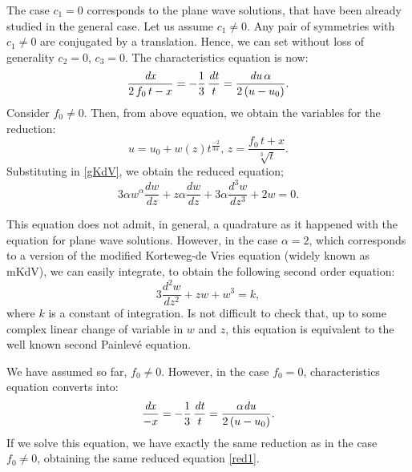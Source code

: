 \documentclass[
11pt,%
tightenlines,%
twoside,%
onecolumn,%
nofloats,%
nobibnotes,%
nofootinbib,%
superscriptaddress,%
noshowpacs,%
centertags]%
{revtex4}
\begin{document}
The case $c_1 = 0$ corresponds to the plane wave solutions, that have been already studied in the general case. Let us assume $c_1 \neq 0$. Any pair of symmetries with $c_1 \neq 0$ are conjugated by a translation. Hence, we can set without loss of generality $c_{2}=0$, $c_{3}=0$. The characteristics equation is now:
\begin{equation}\label{car1a}
{\frac{{\it dx}}{2\,f_{0}\,t-x}}=-\frac{1}{3}\,{\frac{{\it dt}}{t}}={\frac{{\it du}\,\alpha}{2\,(u-u_{0})}}.
   \end{equation}
Consider $ f_{0}\neq 0$. Then, from above equation, we obtain the variables for the reduction:
\begin{equation}
u=u_{0}+w\left(z\right){t}^{\frac{-2}{3\alpha}}  ,\,z={\frac{f_{0}\,t+x}{\sqrt[3]{t}}}.
\end{equation}
 Substituting in  \eqref{gKdV},  we obtain the reduced equation;  
\begin{equation}\label{red1}
3\alpha w^\alpha \frac{dw}{dz} + z \alpha \frac{dw}{dz} + 3\alpha \frac{d^3 w}{dz^3} + 2w = 0.
\end{equation}

This equation does not admit, in general, a quadrature as it happened with the equation for plane wave solutions. However, in  the case  $\alpha=2$, which corresponds to a version of the modified Korteweg-de Vries equation (widely known as mKdV), we can easily integrate, to obtain the following second order equation:
\begin{equation}
 3 \frac{d^2w}{dz^2} + zw + w^3 = k,
\end{equation}
where $k$ is a constant of integration. Is not difficult to check that, up to some complex linear change of variable in $w$ and $z$, this equation is equivalent to the well known second Painlev\'e equation. 
 
 We have assumed so far, $f_0 \neq 0$. However, in the case $f_0=0 $, characteristics equation converts into:
 \begin{equation}\label{car1aa}
{\frac{{\it dx}}{-x}}=-\frac{1}{3}\,{\frac{{\it dt}}{t}}={\frac{{\alpha\it du}}{2\,(u-u_{0})}}.
\end{equation}
If we solve this equation, we have exactly the same reduction as in the case $f_0\neq 0$, obtaining the same reduced equation \eqref{red1}.
 
\end{document}
